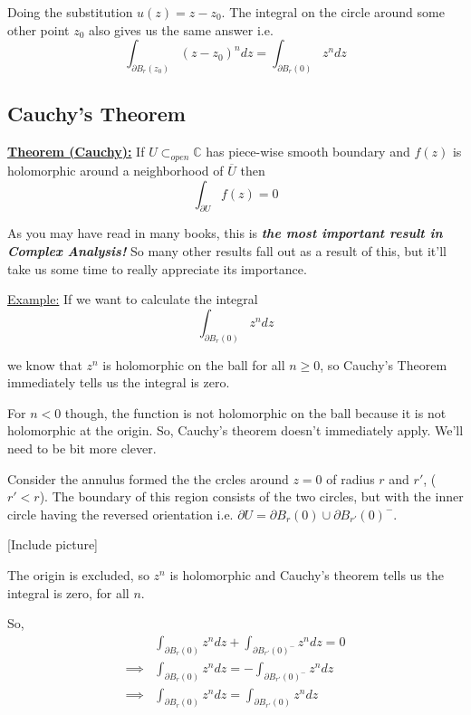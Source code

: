 \documentclass{article}
\newcommand{\C}{\mathbb{C}}
\begin{document}
\vskip 0.5cm
Doing the substitution $u(z) = z - z_0$. The integral on the circle around some other point $z_0$ also gives us the same answer i.e. 
\[ \int_{\partial B_r(z_0)} (z - z_0)^n dz = \int_{\partial B_r(0)} z^n dz \]

\vskip 1cm
\subsection{Cauchy's Theorem}

\vskip 0.5cm
\begin{mathdefinitionbox}{}
  \underline{\textbf{Theorem (Cauchy):}} If $U \subset_{open} \C$ has piece-wise smooth boundary and $f(z)$ is holomorphic around a neighborhood of $\overline{U}$ then 
  \[ \int_{\partial U} f(z) = 0 \] 
\end{mathdefinitionbox}

\vskip 0.5cm
As you may have read in many books, this is \emph{\textbf{the most important result in Complex Analysis!}} So many other results fall out as a result of this, but it'll take us some time to really appreciate its importance.

\vskip 0.5cm
\underline{Example:} If we want to calculate the integral
\[ \int_{\partial B_r(0)} z^n dz \]

we know that $z^n$ is holomorphic on the ball for all $n \geq 0$, so Cauchy's Theorem immediately tells us the integral is zero.

\vskip 0.5cm
For $n < 0$ though, the function is not holomorphic on the ball because it is not holomorphic at the origin. So, Cauchy's theorem doesn't immediately apply. We'll need to be bit more clever.

\vskip 0.5cm
Consider the annulus formed the the crcles around $z = 0$ of radius $r$ and $r'$, ($r' < r$). The boundary of this region consists of the two circles, but with the inner circle having the reversed orientation i.e. $\partial U = \partial B_r(0) \cup \partial B_{r'}(0)^{-}$.

\vskip 0.5cm
[Include picture]

\vskip 0.5cm
The origin is excluded, so $z^n$ is holomorphic and Cauchy's theorem tells us the integral is zero, for all $n$.

\vskip 0.5cm
So, 
\begin{align*}
  &\int_{\partial B_r(0)} z^n dz + \int_{\partial B_{r'}(0)^{-}} z^n dz = 0 \\
  \implies&\int_{\partial B_r(0)} z^n dz = - \int_{\partial B_{r'}(0)^{-}} z^n dz \\
  \implies& \boxed{\int_{\partial B_r(0)} z^n dz = \int_{\partial B_{r'}(0)} z^n dz }
\end{align*}
\end{document}
